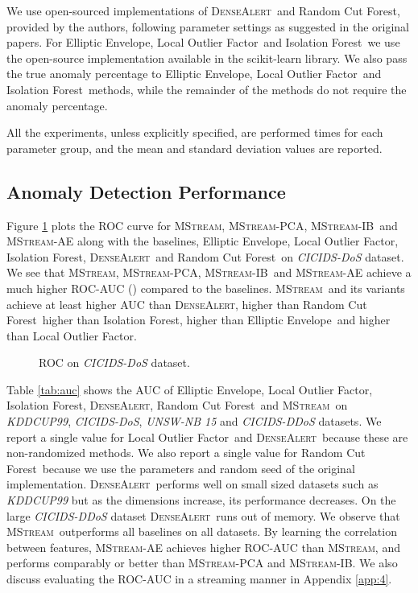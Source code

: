 \documentclass[sigconf]{acmart}
\newcommand{\method}{\textsc{MStream}}
\newcommand{\densealert}{\textsc{DenseAlert}}
\newcommand{\rcf}{Random Cut Forest}
\newcommand{\iso}{Isolation Forest}
\newcommand{\elliptic}{Elliptic Envelope}
\newcommand{\lof}{Local Outlier Factor}
\begin{document}
We use open-sourced implementations of \densealert\ and \rcf, provided by the authors, following parameter settings as suggested in the original papers. For \elliptic, \lof\ and \iso\ we use the open-source implementation available in the scikit-learn \cite{scikit-learn} library. We also pass the true anomaly percentage to \elliptic, \lof\ and \iso\ methods, while the remainder of the methods do not require the anomaly percentage.

All the experiments, unless explicitly specified, are performed  times for each parameter group, and the mean and standard deviation values are reported.



\subsection{Anomaly Detection Performance}



Figure \ref{fig:ROC} plots the ROC curve for \method, \method-PCA, \method-IB\ and \method-AE along with the baselines, \elliptic, \lof, \iso, \densealert\ and \rcf\ on \emph{CICIDS-DoS} dataset. 
We see that \method, \method-PCA, \method-IB\ and \method-AE achieve a much higher ROC-AUC () compared to the baselines. \method\ and its variants achieve at least  higher AUC than \densealert,  higher than \rcf\  higher than \iso,  higher than \elliptic\ and   higher than \lof.


\begin{figure}[!htb]
        \caption{\label{fig:ROC} ROC on \emph{CICIDS-DoS} dataset.}
\end{figure}



Table \ref{tab:auc} shows the AUC of \elliptic, \lof, \iso, \densealert, \rcf\ and \method\ on \emph{KDDCUP99}, \emph{CICIDS-DoS}, \emph{UNSW-NB 15} and \emph{CICIDS-DDoS} datasets. We report a single value for \lof\ and \densealert\ because these are non-randomized methods. We also report a single value for \rcf\ because we use the parameters and random seed of the original implementation. \densealert\ performs well on small sized datasets such as \emph{KDDCUP99} but as the dimensions increase, its performance decreases. On the large \emph{CICIDS-DDoS} dataset \densealert\ runs out of memory. We observe that \method\ outperforms all baselines on all datasets. By learning the correlation between features, \method-AE achieves higher ROC-AUC than \method, and performs comparably or better than \method-PCA and \method-IB. We also discuss evaluating the ROC-AUC in a streaming manner in Appendix \ref{app:4}.
\end{document}

